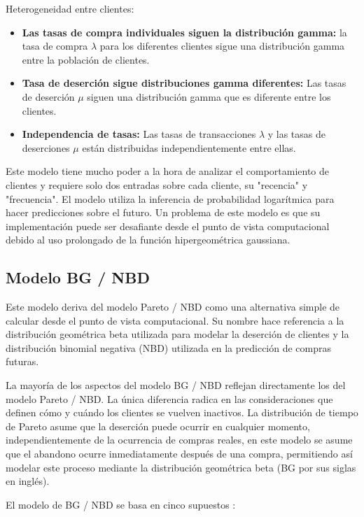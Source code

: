 Heterogeneidad entre clientes:

\begin{itemize}
	\item \textbf{Las tasas de compra individuales siguen la distribución gamma:} la tasa de compra $\lambda$ para los diferentes clientes sigue una distribución gamma entre la población de clientes.
	\item \textbf{Tasa de deserción sigue distribuciones gamma diferentes:} Las tasas de deserción $\mu$ siguen una distribución gamma que es diferente entre los clientes.
	\item \textbf{Independencia de tasas:} Las tasas de transacciones $\lambda$ y las tasas de deserciones $\mu$ están distribuidas independientemente entre ellas.
\end{itemize}

Este modelo tiene mucho poder a la hora de analizar el comportamiento de clientes y requiere solo dos entradas sobre cada cliente, su "recencia" y "frecuencia". El modelo utiliza la inferencia de probabilidad logarítmica para hacer predicciones sobre el futuro. Un problema de este modelo es que su implementación puede ser desafiante desde el punto de vista computacional debido al uso prolongado de la función hipergeométrica gaussiana.

\subsection{Modelo BG / NBD}

Este modelo deriva del modelo Pareto / NBD como una alternativa simple de calcular desde el punto de vista computacional. Su nombre hace referencia a la distribución geométrica beta utilizada para modelar la deserción de clientes y la distribución binomial negativa (NBD) utilizada en la predicción de compras futuras. 

	La mayoría de los aspectos del modelo BG / NBD reflejan directamente los del modelo Pareto / NBD. La única diferencia radica en las consideraciones que definen cómo y cuándo los clientes se vuelven inactivos. La distribución de tiempo de Pareto asume que la deserción puede ocurrir en cualquier momento, independientemente de la ocurrencia de compras reales, en este modelo se asume que el abandono ocurre inmediatamente después de una compra, permitiendo así modelar este proceso mediante la distribución geométrica beta (BG por sus siglas en inglés).

El modelo de BG / NBD se basa en cinco supuestos :

